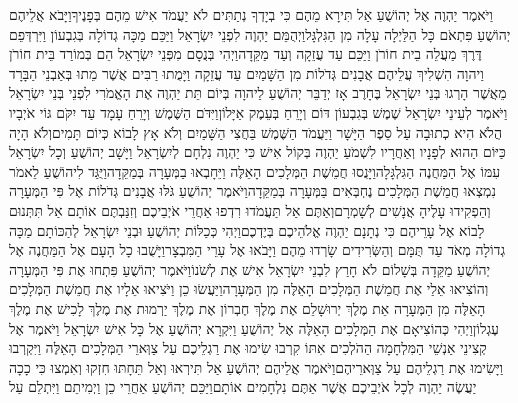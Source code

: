 \documentclass[../main/main.tex]{subfiles}
\begin{document}
\begin{multicols*}{\ncols}
וַיֹּאמֶר יַהְוֶה אֶל יְהוֹשֻׁעַ אַל תִּירָא מֵהֶם כִּי בְיָדְךָ נְתַתִּים לֹא יַעֲמֹד אִישׁ מֵהֶם בְּפָנֶיךָ\PreVerseSpace{}וַיָּבֹא אֲלֵיהֶם יְהוֹשֻׁעַ פִּתְאֹם כָּל הַלַּיְלָה עָלָה מִן הַגִּלְגָּל\PreVerseSpace{}וַיְהֻמֵּם יַהְוֶה לִפְנֵי יִשְׂרָאֵל וַיַּכֵּם מַכָּה גְדוֹלָה בְּגִבְעוֹן וַיִּרְדְּפֵם דֶּרֶךְ מַעֲלֵה בֵית חוֹרֹן וַיַּכֵּם עַד עֲזֵקָה וְעַד מַקֵּדָה\PreVerseSpace{}וַיְהִי בְּנֻסָם מִפְּנֵי יִשְׂרָאֵל הֵם בְּמוֹרַד בֵּית חוֹרֹן וַיהוָה הִשְׁלִיךְ עֲלֵיהֶם אֲבָנִים גְּדֹלוֹת מִן הַשָּׁמַיִם עַד עֲזֵקָה וַיָּמֻתוּ רַבִּים אֲשֶׁר מֵתוּ בְּאַבְנֵי הַבָּרָד מֵאֲשֶׁר הָרְגוּ בְּנֵי יִשְׂרָאֵל בֶּחָרֶב \ClosedSection{}אָז יְדַבֵּר יְהוֹשֻׁעַ לַיהוָה בְּיוֹם תֵּת יַהְוֶה אֶת הָאֱמֹרִי לִפְנֵי בְּנֵי יִשְׂרָאֵל וַיֹּאמֶר לְעֵינֵי יִשְׂרָאֵל שֶׁמֶשׁ בְּגִבְעוֹן דּוֹם וְיָרֵחַ בְּעֵמֶק אַיָּלוֹן\PreVerseSpace{}וַיִּדֹּם הַשֶּׁמֶשׁ וְיָרֵחַ עָמָד עַד יִקֹּם גּוֹי אֹיְבָיו הֲלֹא הִיא כְתוּבָה עַל סֵפֶר הַיָּשָׁר וַיַּעֲמֹד הַשֶּׁמֶשׁ בַּחֲצִי הַשָּׁמַיִם וְלֹא אָץ לָבוֹא כְּיוֹם תָּמִים\PreVerseSpace{}וְלֹא הָיָה כַּיּוֹם הַהוּא לְפָנָיו וְאַחֲרָיו לִשְׁמֹעַ יַהְוֶה בְּקוֹל אִישׁ כִּי יַהְוֶה נִלְחָם לְיִשְׂרָאֵל \ClosedSection{}וַיָּשָׁב יְהוֹשֻׁעַ וְכָל יִשְׂרָאֵל עִמּוֹ אֶל הַמַּחֲנֶה הַגִּלְגָּלָה\PreVerseSpace{}וַיָּנֻסוּ חֲמֵשֶׁת הַמְּלָכִים הָאֵלֶּה וַיֵּחָבְאוּ בַמְּעָרָה בְּמַקֵּדָה\PreVerseSpace{}וַיֻּגַּד לִיהוֹשֻׁעַ לֵאמֹר נִמְצְאוּ חֲמֵשֶׁת הַמְּלָכִים נֶחְבְּאִים בַּמְּעָרָה בְּמַקֵּדָה\PreVerseSpace{}וַיֹּאמֶר יְהוֹשֻׁעַ גֹּלּוּ אֲבָנִים גְּדֹלוֹת אֶל פִּי הַמְּעָרָה וְהַפְקִידוּ עָלֶיהָ אֲנָשִׁים לְשָׁמְרָם\PreVerseSpace{}וְאַתֶּם אַל תַּעֲמֹדוּ רִדְפוּ אַחֲרֵי אֹיְבֵיכֶם וְזִנַּבְתֶּם אוֹתָם אַל תִּתְּנוּם לָבוֹא אֶל עָרֵיהֶם כִּי נְתָנָם יַהְוֶה אֱלֹהֵיכֶם בְּיֶדְכֶם\PreVerseSpace{}וַיְהִי כְּכַלּוֹת יְהוֹשֻׁעַ וּבְנֵי יִשְׂרָאֵל לְהַכּוֹתָם מַכָּה גְדוֹלָה מְאֹד עַד תֻּמָּם וְהַשְּׂרִידִים שָׂרְדוּ מֵהֶם וַיָּבֹאוּ אֶל עָרֵי הַמִּבְצָר\PreVerseSpace{}וַיָּשֻׁבוּ כָל הָעָם אֶל הַמַּחֲנֶה אֶל יְהוֹשֻׁעַ מַקֵּדָה בְּשָׁלוֹם לֹא חָרַץ לִבְנֵי יִשְׂרָאֵל אִישׁ\SubEnd{} אֶת לְשֹׁנוֹ\PreVerseSpace{}וַיֹּאמֶר יְהוֹשֻׁעַ פִּתְחוּ אֶת פִּי הַמְּעָרָה וְהוֹצִיאוּ אֵלַי אֶת חֲמֵשֶׁת הַמְּלָכִים הָאֵלֶּה מִן הַמְּעָרָה\PreVerseSpace{}וַיַּעֲשׂוּ כֵן וַיֹּצִיאוּ אֵלָיו אֶת חֲמֵשֶׁת הַמְּלָכִים הָאֵלֶּה מִן הַמְּעָרָה אֵת מֶלֶךְ יְרוּשָׁלֵם אֶת מֶלֶךְ חֶבְרוֹן אֶת מֶלֶךְ יַרְמוּת אֶת מֶלֶךְ לָכִישׁ אֶת מֶלֶךְ עֶגְלוֹן\PreVerseSpace{}וַיְהִי כְּהוֹצִיאָם אֶת הַמְּלָכִים הָאֵלֶּה אֶל יְהוֹשֻׁעַ וַיִּקְרָא יְהוֹשֻׁעַ אֶל כָּל אִישׁ יִשְׂרָאֵל וַיֹּאמֶר אֶל קְצִינֵי אַנְשֵׁי הַמִּלְחָמָה הַהֹלְכִים\SubEnd{} אִתּוֹ קִרְבוּ שִׂימוּ אֶת רַגְלֵיכֶם עַל צַוְּארֵי הַמְּלָכִים הָאֵלֶּה וַיִּקְרְבוּ וַיָּשִׂימוּ אֶת רַגְלֵיהֶם עַל צַוְּארֵיהֶם\PreVerseSpace{}וַיֹּאמֶר אֲלֵיהֶם יְהוֹשֻׁעַ אַל תִּירְאוּ וְאַל תֵּחָתּוּ חִזְקוּ וְאִמְצוּ כִּי כָכָה יַעֲשֶׂה יַהְוֶה לְכָל אֹיְבֵיכֶם אֲשֶׁר אַתֶּם נִלְחָמִים אוֹתָם\PreVerseSpace{}וַיַּכֵּם יְהוֹשֻׁעַ אַחֲרֵי כֵן וַיְמִיתֵם וַיִּתְלֵם עַל 
\end{multicols*}
\end{document}
